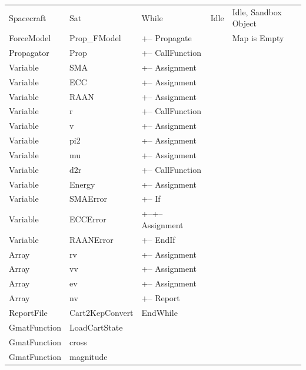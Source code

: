 \begin{center}
\tablelasttail{\hline}
\begin{supertabular}{|l l|l|l|l|}
Spacecraft & Sat & While & Idle & Idle, Sandbox Object\\
ForceModel & Prop\_FModel & +-- Propagate & & Map is Empty \\
Propagator & Prop & +-- CallFunction & & \\
Variable & SMA & +-- Assignment & & \\
Variable & ECC & +-- Assignment & & \\
Variable & RAAN & +-- Assignment & & \\
Variable & r & +-- CallFunction & & \\
Variable & v & +-- Assignment & & \\
Variable & pi2 & +-- Assignment & & \\
Variable & mu & +-- Assignment & & \\
Variable & d2r & +-- CallFunction & & \\
Variable & Energy & +-- Assignment & & \\
Variable & SMAError & +-- If & & \\
Variable & ECCError & +--+-- Assignment & & \\
Variable & RAANError & +-- EndIf & & \\
Array & rv & +-- Assignment & & \\
Array & vv & +-- Assignment & & \\
Array & ev & +-- Assignment & & \\
Array & nv & +-- Report & & \\
ReportFile & Cart2KepConvert & EndWhile & & \\
GmatFunction & LoadCartState & & & \\
GmatFunction & cross & & & \\
GmatFunction & magnitude & & & \\
\end{supertabular}
\end{center}

